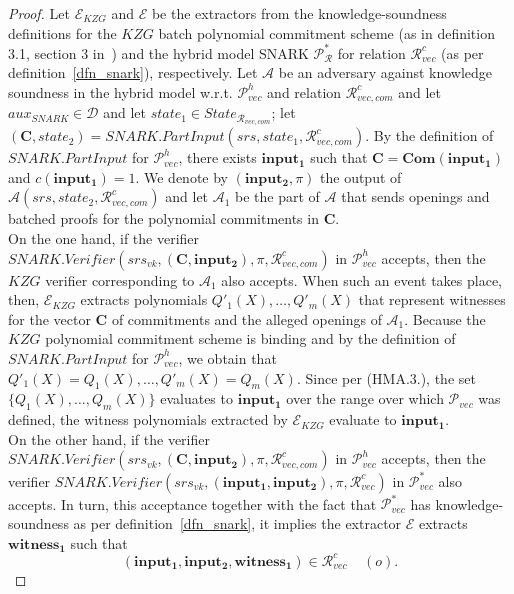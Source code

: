 \begin{proof} Let $\mathcal{E}_{\mathit{KZG}}$ and $\mathcal{E}$ be the extractors from the knowledge-soundness definitions for the 
$\mathit{KZG}$ batch polynomial commitment scheme (as in definition 3.1, section 3 in~\cite{plonk}) and the hybrid model 
SNARK $\mathscr{P}^*_{\mathcal{R}}$ for relation $\mathcal{R}^c_{\mathit{vec}}$ (as per definition~\ref{dfn_snark}), respectively. 
Let $\mathcal{A}$ be an adversary against knowledge soundness in the hybrid model w.r.t. 
$\mathscr{P}_{\mathit{vec}}^{h}$ and relation $\mathcal{R}_{\mathit{vec}, \mathit{com}}^c$ and let $\mathit{aux}_{\mathit{SNARK}} \in \mathcal{D}$ 
and let $\mathit{state_1} \in \mathit{State}_{\mathcal{R}_{\mathit{vec}, \mathit{com}}}$; let 
$(\mathbf{C},\mathit{state_2}) = \mathit{SNARK.PartInput}(\mathit{srs}, \mathit{state_1}, \mathcal{R}_{\mathit{vec}, \mathit{com}}^c)$. 
By the definition of $\mathit{SNARK.PartInput}$ for $\mathscr{P}_{\mathit{vec}}^{h}$, there exists 
$\mathbf{input_1}$ such that $\mathbf{C} = \mathbf{Com}(\mathbf{input_1})$ and $c(\mathbf{input_1}) = 1$. 
We denote by $(\mathbf{input_2}, \pi)$ the output of $\mathcal{A}(\mathit{srs}, \mathit{state_2},  \mathcal{R}_{\mathit{vec}, \mathit{com}}^c)$ 
and let $\mathcal{A}_1$ be the part of $\mathcal{A}$ that sends openings and batched proofs for the polynomial commitments in 
$\mathbf{C}$. \\

\noindent On the one hand, if the verifier $\mathit{SNARK.Verifier}(\mathit{srs}_{\mathit{vk}}, (\mathbf{C},\mathbf{input_2}),\pi,\mathcal{R}_{\mathit{vec}, \mathit{com}}^c)$ 
in $\mathscr{P}_{\mathit{vec}}^{h}$ accepts, then the $\mathit{KZG}$ verifier corresponding to 
$\mathcal{A}_1$ also accepts. When such an event takes place, then, \ewnp $\mathcal{E}_{\mathit{KZG}}$ extracts polynomials 
$Q'_1(X), \ldots, Q'_m(X)$ that represent witnesses for the vector $\mathbf{C}$ of commitments and the alleged openings of $\mathcal{A}_1$. 
Because the $\mathit{KZG}$ polynomial commitment scheme is binding and by the definition of 
$\mathit{SNARK.PartInput}$ for $\mathscr{P}_{\mathit{vec}}^{h}$, we obtain that $Q'_1(X) = Q_1(X), \ldots, Q'_m(X) = Q_m(X).$ 
Since per (HMA.3.), the set $\{Q_1(X), \ldots, Q_m(X)\}$ evaluates to $\mathbf{input_1}$ over the range over which $\mathscr{P}_{\mathit{vec}}$ 
was defined, \ewnp the witness polynomials extracted by $\mathcal{E}_{\mathit{KZG}}$ evaluate to $\mathbf{input_1}$. \\

\noindent On the other hand, if the verifier $\mathit{SNARK.Verifier}(\mathit{srs}_{\mathit{vk}}, (\mathbf{C},\mathbf{input_2}),\pi,\mathcal{R}_{\mathit{vec}, \mathit{com}}^c)$ 
in $\mathscr{P}_{\mathit{vec}}^{h}$ accepts, then the verifier 
$\mathit{SNARK.Verifier}(\mathit{srs}_{\mathit{vk}}, (\mathbf{input_1},\mathbf{input_2}),\pi,\mathcal{R}_{\mathit{vec}}^c)$ 
in $\mathscr{P}_{\mathit{vec}}^{*}$ also accepts. In turn, this acceptance together with the fact that $\mathscr{P}_{\mathit{vec}}^{*}$ 
has knowledge-soundness as per definition~\ref{dfn_snark}, it implies the extractor $\mathcal{E}$ \ewnp extracts $\mathbf{witness_1}$ 
such that $$(\mathbf{input_1}, \mathbf{input_2}, \mathbf{witness_1}) \in \mathcal{R}_{\mathit{vec}}^{c} \ \ \ \ \ (o).$$ 


\end{proof}
